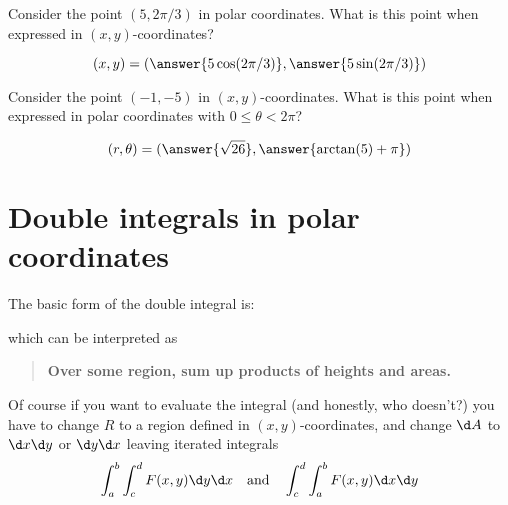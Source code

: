 \documentclass{ximera}
\begin{document}
\begin{question}
  Consider the point $(5, 2\pi/3)$ in polar coordinates. What is this
  point when expressed in $(x,y)$-coordinates?
  \begin{prompt}
    \[
    (x,y) = (\answer{5\cos(2\pi/3)}, \answer{5 \sin(2\pi/3)})
    \]
  \end{prompt}
  \begin{question}
    Consider the point $(-1, -5)$ in $(x,y)$-coordinates. What is this
    point when expressed in polar coordinates with $0\le\theta<2\pi$?
    \begin{prompt}
      \[
      (r,\theta) = (\answer{\sqrt{26}}, \answer{\arctan(5)+\pi})
      \]
    \end{prompt}
  \end{question}
\end{question}

\section{Double integrals in polar coordinates}

The basic form of the double integral is:
\begin{image}
\end{image}
which can be interpreted as
\begin{quote}
  \textbf{Over some region,
    sum up products of
    heights and areas.}
\end{quote}
Of course if you want to evaluate the integral (and honestly, who
doesn't?) you have to change $R$ to a region defined in $(x,y)$-coordinates,
and change $\d A$ to $\d x\d y$ or $\d y\d x$ leaving iterated integrals
\[
\int_a^b\int_c^d F(x,y) \d y \d x\quad\text{and}\quad \int_c^d \int_a^b F(x,y) \d x\d y
\]
\end{document}
